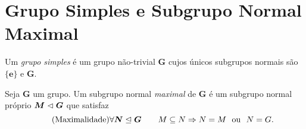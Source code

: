 







































\cleardoublepage
\section{Grupo Simples e Subgrupo Normal Maximal}

\begin{defi}
Um \emph{grupo simples} é um grupo não-trivial $\bm G$ cujos únicos subgrupos normais são $\bm{\{e\}}$ e $\bm G$.
\end{defi}

\begin{defi}
Seja $\bm G$ um grupo. Um subgrupo normal \emph{maximal} de $\bm G$ é um subgrupo normal próprio $\bm M \mathrel{\lhd} \bm G$ que satisfaz
	\begin{equation*}
	\tag{Maximalidade} \forall \bm N \mathrel{\unlhd} \bm G \qquad M \subseteq N \Rightarrow N = M \text{\ \ ou\ \ } N = G.
	\end{equation*}
\end{defi}

